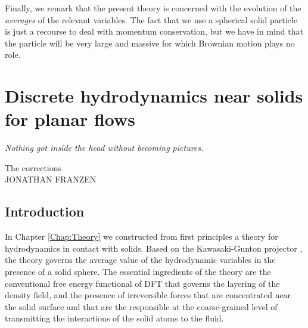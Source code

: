 \documentclass[b5paper,openright,10pt]{book}
\begin{document}
Finally, we remark that the present theory is concerned with the evolution of the \textit{averages} of the relevant variables. 
The fact that we use a spherical solid particle is just a recourse to deal with momentum conservation, but we have in mind that the particle will be very large and massive for which Brownian motion plays no role. 


\chapter{Discrete hydrodynamics near solids for planar flows}\label{Chap:Planar}
\epigraph{\textit{Nothing got inside the head without becoming pictures.}}{The corrections \\ JONATHAN FRANZEN}
\section{Introduction}
In Chapter \ref{Chap:Theory} we constructed  from  first
principles a theory  for hydrodynamics in contact with  solids.    Based   on    the   Kawasaki-Gunton   projector
\cite{Kawasaki1973,Grabert1982}, the theory  governs the average value
of the hydrodynamic variables in the  presence of a solid sphere.  The
essential ingredients of  the theory are the  conventional free energy
functional of DFT that governs the  layering of the density field, and
the presence  of irreversible  forces that  are concentrated  near the
solid surface and that are the responsible at the coarse-grained level
of transmitting the  interactions of the solid atoms to  the fluid. 
\end{document}
